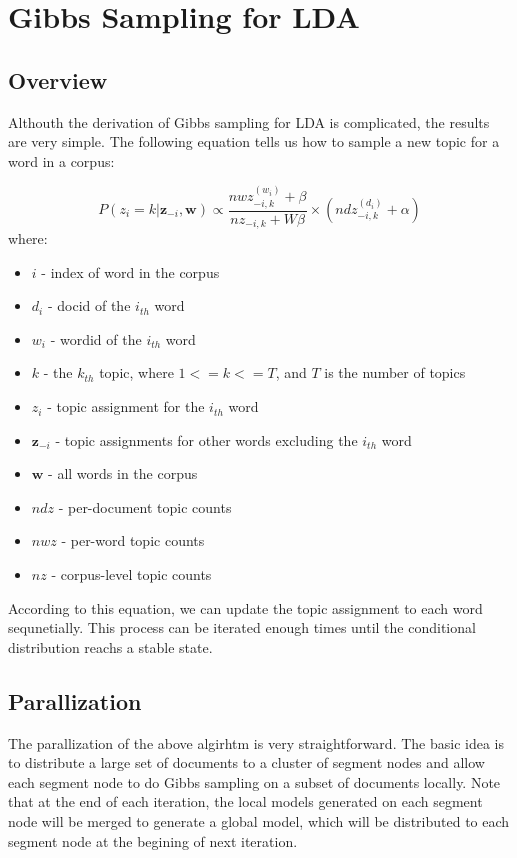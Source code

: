 \section{Gibbs Sampling for LDA}
\subsection{Overview}
Althouth the derivation of Gibbs sampling for LDA is complicated, the results are very simple. The following equation tells us how to sample a new topic for a word in a corpus:

\begin{equation}
P(z_i=k|\textbf{z}_{-i},\textbf{w}) \propto \frac{nwz_{-i,k}^{(w_i)} +\beta}{nz_{-i,k}+W \beta}\times(ndz_{-i,k}^{(d_i)}+\alpha)
\end{equation}
where:
\begin{itemize}
\item $i$ - index of word in the corpus
\item $d_i$ - docid of the $i_{th}$ word
\item $w_i$ - wordid of the $i_{th}$ word
\item $k$ - the $k_{th}$ topic, where $1 <= k <= T$, and $T$ is the number of topics
\item $z_i$ - topic assignment for the $i_{th}$ word
\item $\textbf{z}_{-i}$ - topic assignments for other words excluding the $i_{th}$ word
\item $\textbf{w}$ - all words in the corpus
\item $ndz$ - per-document topic counts
\item $nwz$ - per-word topic counts
\item $nz$ - corpus-level topic counts
\end{itemize}

According to this equation, we can update the topic assignment to each word sequnetially. This process can be iterated enough times until the conditional distribution reachs a stable state.

\subsection{Parallization}
The parallization of the above algirhtm is very straightforward. The basic idea is to distribute a large set of documents to a cluster of segment nodes and allow each segment node to do Gibbs sampling on a subset of documents locally. Note that at the end of each iteration, the local models generated on each segment node will be merged to generate a global model, which will be distributed to each segment node at the begining of next iteration.

